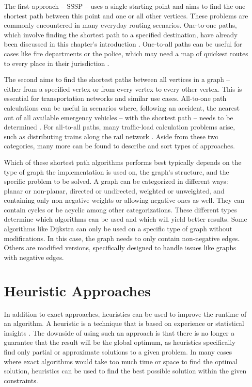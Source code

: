 The first approach -- SSSP -- uses a single starting point and aims to find the one shortest path between this point and one or all other vertices.
These problems are commonly encountered in many everyday routing scenarios. 
One-to-one paths, which involve finding the shortest path to a specified destination, have already been discussed in this chapter's introduction \cite{sanders_shortest_2019}.
One-to-all paths can be useful for cases like fire departments or the police, which may need a map of quickest routes to every place in their jurisdiction \cite{sanders_shortest_2019}.

The second aims to find the shortest paths between all vertices in a graph -- either from a specified vertex or from every vertex to every other vertex. 
This is essential for transportation networks and similar use cases. 
All-to-one path calculations can be useful in scenarios where, following an accident, the nearest out of all available emergency vehicles -- with the shortest path -- needs to be determined \cite{khamayseh_efficient_2015}.
For all-to-all paths, many traffic-load calculation problems arise, such as distributing trains along the rail network \cite{curtis_rewire_2012}.
Aside from these two categories, many more can be found to describe and sort types of approaches. 


Which of these shortest path algorithms performs best typically depends on the type of graph the implementation is used on, the graph's structure, and the specific problem to be solved. 
A graph can be categorized in different ways: planar or non-planar, directed or undirected, weighted or unweighted, and containing only non-negative weights or allowing negative ones as well.
They can contain cycles or be acyclic among other categorizations. 
These different types determine which algorithms can be used and which will yield better results.
Some algorithms like Dijkstra can only be used on a specific type of graph without modifications. 
In this case, the graph needs to only contain non-negative edges.
Others are modified versions, specifically designed to handle issues like graphs with negative edges. 


\section{Heuristic Approaches}
\label{sec:metaHeuristics}

In addition to exact approaches, heuristics can be used to improve the runtime of an algorithm.
A heuristic is a technique that is based on experience or statistical insights \cite{gendreau_handbook_2010}.
The downside of using such an approach is that there is no longer a guarantee that the result will be the global optimum, as heuristics specifically find only partial or approximate solutions to a given problem. 
In many cases where exact algorithms would take too much time or space to find the optimal solution, heuristics can be used to find the best possible solution within the given constraints.

